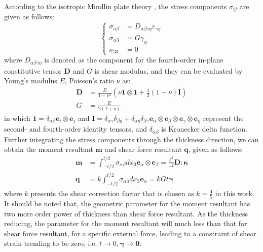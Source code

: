 According to the isotropic Mindlin plate theory \cite{hughes2000}, the stress components $\sigma_{ij}$ are given as follows:
\begin{equation}
    \left\{
    \begin{aligned}
        \sigma_{\alpha\beta} &= D_{\alpha\beta\gamma\eta} \varepsilon_{\gamma\eta} \\
        \sigma_{\alpha 3} &= G \gamma_\alpha \\
        \sigma_{33} &= 0
    \end{aligned}
    \right.
\end{equation}
where $D_{\alpha\beta\gamma\eta}$ is denoted as the component for the fourth-order in-plane constitutive tensor $\boldsymbol D$ and $G$ is shear modulus, and they can be evaluated by Young's modulus $E$, Poisson's ratio $\nu$ as:
\begin{align}
    \boldsymbol D &=
    \frac{E}{1-\nu^2} \left (
        \nu \boldsymbol 1\otimes \boldsymbol 1 + \frac{1}{2}(1-\nu) \boldsymbol I
    \right )
    \\
    G &= \frac{E}{2(1+\nu)}
\end{align}
in which $\boldsymbol 1 = \delta_{\alpha\beta} \boldsymbol e_i\otimes \boldsymbol e_j$ and
$\boldsymbol I = \delta_{\alpha\gamma}\delta_{\beta\eta} + \delta_{\alpha\eta}\delta_{\beta\gamma} \boldsymbol e_\alpha \otimes \boldsymbol e_\beta \otimes \boldsymbol e_\gamma \otimes \boldsymbol e_\eta$
represent the second- and fourth-order identity tensors,
and $\delta_{\alpha\beta}$ is Kronecker delta function.
Further integrating the stress components through the thickness direction, we can obtain the moment resultant $\boldsymbol m$ and shear force resultant $\boldsymbol q$, given as follows:
\begin{align}
    \boldsymbol m &= \int_{-t/2}^{t/2} \sigma_{\alpha\beta} dx_3 \boldsymbol e_\alpha \otimes \boldsymbol e_\beta =
    \frac{t^3}{12} \boldsymbol D : \boldsymbol \kappa \\
    \boldsymbol q &= k\int_{-t/2}^{t/2} \sigma_{\alpha 3} dx_3 \boldsymbol e_\alpha =
    kGt \boldsymbol \gamma
\end{align}
where $k$ presents the shear correction factor that is chosen as $k=\frac{4}{5}$ in this work.
It should be noted that, the geometric parameter for the moment resultant has two more order power of thickness than shear force resultant.
As the thickness reducing, the parameter for the moment resultant will much less than that for shear force resultant,
for a specific external force, leading to a constraint of shear strain trending to be zero, i.e. $t\rightarrow 0, \boldsymbol \gamma \rightarrow \boldsymbol 0$.

